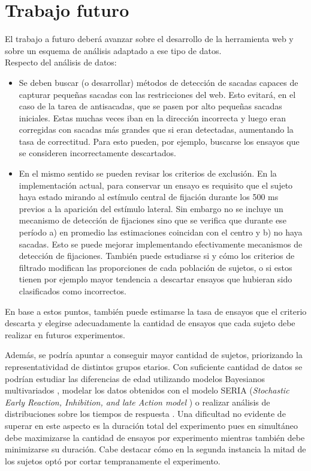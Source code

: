 \section{Trabajo futuro}

El trabajo a futuro deberá avanzar sobre el desarrollo de la herramienta web y
sobre un esquema de análisis adaptado a ese tipo de datos. \\
Respecto del análisis de datos: 
\begin{itemize}
  \item Se deben buscar (o desarrollar) métodos de detección de sacadas capaces
de capturar pequeñas sacadas con las restricciones del \eyetracking web.
  Esto evitará, en el caso de la tarea de antisacadas, que se pasen por alto
pequeñas sacadas iniciales.
  Estas muchas veces iban en la dirección incorrecta y luego eran corregidas
con sacadas más grandes que si eran detectadas, aumentando la tasa de
correctitud.
  Para esto pueden, por ejemplo, buscarse los ensayos que se consideren
incorrectamente descartados. 

  \item En el mismo sentido se pueden revisar los criterios de exclusión.
  En la implementación actual, para conservar un ensayo es requisito que el
sujeto haya estado mirando al estímulo central de fijación durante los 500 ms
previos a la aparición del estímulo lateral.
  Sin embargo no se incluye un mecanismo de detección de fijaciones sino que se
verifica que durante ese período a) en promedio las estimaciones coincidan con
el centro y b) no haya sacadas.
  Esto se puede mejorar implementando efectivamente mecanismos de detección de
fijaciones.
  También puede estudiarse si y cómo los criterios de filtrado modifican las
proporciones de cada población de sujetos, o si estos tienen por ejemplo mayor
tendencia a descartar ensayos que hubieran sido clasificados como incorrectos.
\end{itemize}

En base a estos puntos, también puede estimarse la tasa de ensayos que el
criterio descarta y elegirse adecuadamente la cantidad de ensayos que cada
sujeto debe realizar en futuros experimentos.

Además, se podría apuntar a conseguir mayor cantidad de sujetos, priorizando la
representatividad de distintos grupos etarios.
Con suficiente cantidad de datos se podrían estudiar las diferencias de edad
utilizando modelos Bayesianos multivariados
\cite{plomecka_2020_retest_reliability}, modelar los datos obtenidos con el
modelo SERIA (\textit{Stochastic Early Reaction, Inhibition, and late Action
model} \cite{aponte_2017_seria}) o realizar análisis de distribuciones sobre
los tiempos de respuesta \cite{unsworth_2011_distribution_analysis}.
Una dificultad no evidente de superar en este aspecto es la duración total del
experimento pues en simultáneo debe maximizarse la cantidad de ensayos por
experimento mientras también debe minimizarse su duración.
Cabe destacar cómo en la segunda instancia la mitad de los sujetos optó por
cortar tempranamente el experimento.

